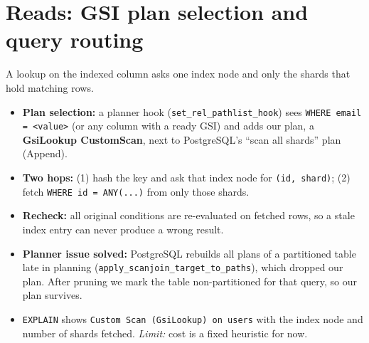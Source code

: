 \documentclass[11pt,a4paper]{article}
\begin{document}
\section{Reads: GSI plan selection and query routing}
A lookup on the indexed column asks one index node and only the shards that hold matching rows.
\begin{itemize}
  \item \textbf{Plan selection:} a planner hook (\texttt{set\_rel\_pathlist\_hook}) sees
        \texttt{WHERE email = <value>} (or any column with a ready GSI) and adds our plan, a
        \textbf{GsiLookup CustomScan}, next to PostgreSQL's ``scan all shards'' plan (Append).
  \item \textbf{Two hops:} (1) hash the key and ask that index node for \texttt{(id, shard)};
        (2) fetch \texttt{WHERE id = ANY(...)} from only those shards.
  \item \textbf{Recheck:} all original conditions are re-evaluated on fetched rows, so a stale
        index entry can never produce a wrong result.
  \item \textbf{Planner issue solved:} PostgreSQL rebuilds all plans of a partitioned table late in
        planning (\texttt{apply\_scanjoin\_target\_to\_paths}), which dropped our plan. After pruning
        we mark the table non-partitioned for that query, so our plan survives.
  \item \texttt{EXPLAIN} shows \texttt{Custom Scan (GsiLookup) on users} with the index node and
        number of shards fetched. \emph{Limit:} cost is a fixed heuristic for now.
\end{itemize}
\end{document}

